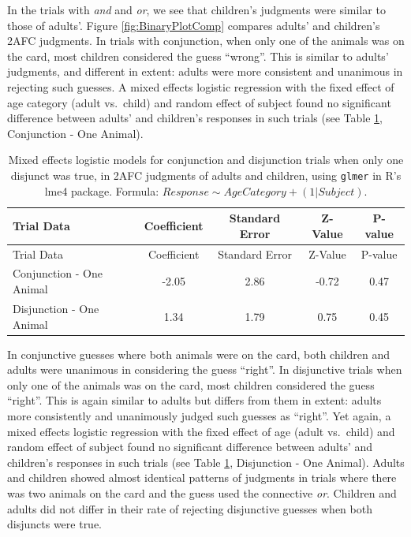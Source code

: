 \documentclass[oneside]{report}
\theoremstyle{definition}
\theoremstyle{definition}
\theoremstyle{definition}
\theoremstyle{remark}
\begin{document}
In the trials with \emph{and} and \emph{or}, we see that children's
judgments were similar to those of adults'. Figure
\ref{fig:BinaryPlotComp} compares adults' and children's 2AFC judgments.
In trials with conjunction, when only one of the animals was on the
card, most children considered the guess ``wrong''. This is similar to
adults' judgments, and different in extent: adults were more consistent
and unanimous in rejecting such guesses. A mixed effects logistic
regression with the fixed effect of age category (adult vs.~child) and
random effect of subject found no significant difference between adults'
and children's responses in such trials (see Table
\ref{tab:statsStudy3}, Conjunction - One Animal).
\begin{longtable}[]{@{}lcccc@{}}
\caption{\label{tab:statsStudy3} Mixed effects logistic models for
conjunction and disjunction trials when only one disjunct was true, in
2AFC judgments of adults and children, using \texttt{glmer} in R's lme4
package. Formula:
\(Response \sim Age Category + (1|Subject)\).}\tabularnewline
\toprule
Trial Data & Coefficient & Standard Error & Z-Value &
P-value\tabularnewline
\midrule
\endfirsthead
\toprule
Trial Data & Coefficient & Standard Error & Z-Value &
P-value\tabularnewline
\midrule
\endhead
Conjunction - One Animal & -2.05 & 2.86 & -0.72 & 0.47\tabularnewline
Disjunction - One Animal & 1.34 & 1.79 & 0.75 & 0.45\tabularnewline
\bottomrule
\end{longtable}
In conjunctive guesses where both animals were on the card, both
children and adults were unanimous in considering the guess ``right''.
In disjunctive trials when only one of the animals was on the card, most
children considered the guess ``right''. This is again similar to adults
but differs from them in extent: adults more consistently and
unanimously judged such guesses as ``right''. Yet again, a mixed effects
logistic regression with the fixed effect of age (adult vs.~child) and
random effect of subject found no significant difference between adults'
and children's responses in such trials (see Table
\ref{tab:statsStudy3}, Disjunction - One Animal). Adults and children
showed almost identical patterns of judgments in trials where there was
two animals on the card and the guess used the connective \emph{or}.
Children and adults did not differ in their rate of rejecting
disjunctive guesses when both disjuncts were true.
\end{document}
